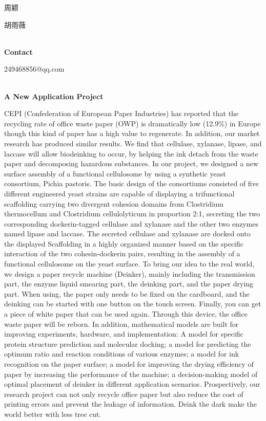   周颖

  胡雨薇


\textbf{\\Contact}

  249468856@qq.com


\textbf{\\A New Application Project\\}\begin{spacing}{1.5}

CEPI (Confederation of European Paper Industries) has reported that the recycling rate of office waste paper (OWP) is dramatically low (12.9\%) in Europe though this kind of paper has a high value to regenerate. In addition, our market research has produced similar results. We find that cellulase, xylanase, lipase, and laccase will allow biodeinking to occur, by helping the ink detach from the waste paper and decomposing hazardous substances. In our project, we designed a new surface assembly of a functional cellulosome by using a synthetic yeast consortium, Pichia pastoris. The basic design of the consortiums consisted of five different engineered yeast strains are capable of displaying a trifunctional scaffolding carrying two divergent cohesion domains from Clostridium thermocellum and Clostridium cellulolyticum in proportion 2:1, secreting the two corresponding dockerin-tagged cellulase and xylanase and the other two enzymes named lipase and laccase. The secreted cellulase and xylanase are docked onto the displayed Scaffolding in a highly organized manner based on the specific interaction of the two cohesin-dockerin pairs, resulting in the assembly of a functional cellulosome on the yeast surface. To bring our idea to the real world, we design a paper recycle machine (Deinker), mainly including the transmission part, the enzyme liquid smearing part, the deinking part, and the paper drying part. When using, the paper only needs to be fixed on the cardboard, and the deinking can be started with one button on the touch screen. Finally, you can get a piece of white paper that can be used again. Through this device, the office waste paper will be reborn. In addition, mathematical models are built for improving experiments, hardware, and implementation: A model for specific protein structure prediction and molecular docking; a model for predicting the optimum ratio and reaction conditions of various enzymes; a model for ink recognition on the paper surface; a model for improving the drying efficiency of paper by increasing the performance of the machine; a decision-making model of optimal placement of deinker in different application scenarios. Prospectively, our research project can not only recycle office paper but also reduce the cost of printing errors and prevent the leakage of information. Deink the dark make the world better with less tree cut.\end{spacing}
\\


